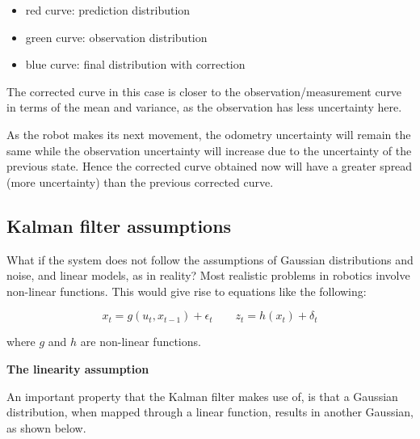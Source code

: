 \documentclass[a4paper]{article}
\begin{document}
\begin{itemize}
    \item red curve: prediction distribution
    \item green curve: observation distribution
    \item blue curve: final distribution with correction
\end{itemize}

The corrected curve in this case is closer to the observation/measurement curve in terms of the mean and variance, as the observation has less uncertainty here.

As the robot makes its next movement, the odometry uncertainty will remain the same while the observation uncertainty will increase due to the uncertainty of the previous state. Hence the corrected curve obtained now will have a greater spread (more uncertainty) than the previous corrected curve.

\subsection{Kalman filter assumptions}

What if the system does not follow the assumptions of Gaussian distributions and noise, and linear models, as in reality? Most realistic problems in robotics involve non-linear functions. This would give rise to equations like the following:

\begin{equation*}
    x_t = g(u_t, x_{t-1}) + \epsilon_t
    \qquad
    z_t = h(x_t) + \delta_t
\end{equation*}

where $g$ and $h$ are non-linear functions.

\textbf{The linearity assumption}

An important property that the Kalman filter makes use of, is that a Gaussian distribution, when mapped through a linear function, results in another Gaussian, as shown below.
\end{document}

